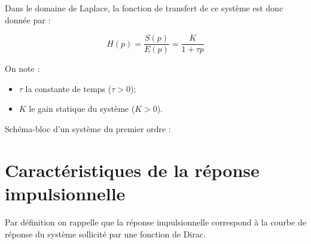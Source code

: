 \documentclass[10pt,fleqn]{article} %
\begin{document}
\begin{minipage}[c]{.6\linewidth}
\begin{defi}
Dans le domaine de Laplace, la fonction de transfert de ce système est donc
donnée par :

$$
H(p)=\dfrac{S(p)}{E(p)} = \dfrac{K}{1+\tau p}
$$

On note :
\begin{itemize}
 \item $\tau$ la constante de temps ($\tau>0$);
\item $K$ le gain statique du système ($K>0$).
\end{itemize}
\end{defi}
\end{minipage}\hfill
\begin{minipage}[c]{.35\linewidth}
Schéma-bloc d'un système du premier ordre :

\begin{center}
\end{center}
\end{minipage}

\section{Caractéristiques de la réponse impulsionnelle}
Par définition on rappelle que la réponse impulsionnelle correspond à la courbe de réponse du système sollicité par une fonction de Dirac.
\end{document}
